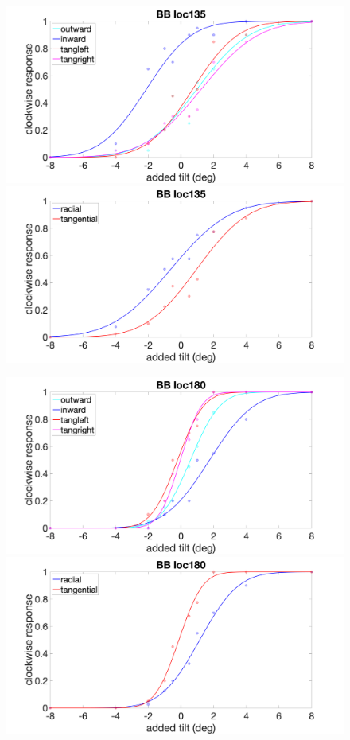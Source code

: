 \documentclass[11pt]{article} %
\begin{document}
\begin{figure}[H]
\centering %
\includegraphics[scale=.15]{Images/BB_PF_loc135_4conds.png}
\includegraphics[scale=.15]{Images/BB_PF_loc135_2conds.png}
\end{figure}
\begin{figure}[H]
\centering %
\includegraphics[scale=.15]{Images/BB_PF_loc180_4conds.png}
\includegraphics[scale=.15]{Images/BB_PF_loc180_2conds.png}
\end{figure}
\end{document}
